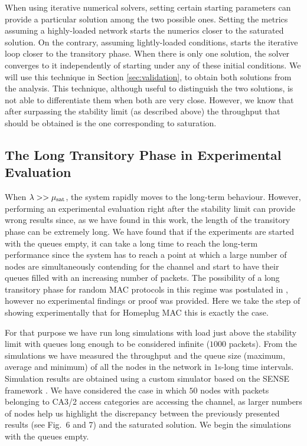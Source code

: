 \documentclass[preprint,12pt]{elsarticle}
\begin{document}
When using iterative numerical solvers, setting certain starting parameters can provide a particular solution among the two possible ones. Setting the metrics assuming a highly-loaded network starts the numerics closer to the saturated solution. On the contrary, assuming lightly-loaded conditions, starts the iterative loop closer to the transitory phase. When there is only one solution, the solver converges to it independently of starting under any of these initial conditions. We will use this technique in Section \ref{sec:validation}, to obtain both solutions from the analysis. This technique, although useful to distinguish the two solutions, is not able to differentiate them when both are very close. However, we know that after surpassing the stability limit (as described above) the throughput that should be obtained is the one corresponding to saturation. 

\subsection{The Long Transitory Phase in Experimental Evaluation}

When $\lambda >> \mu_{\rm sat}$, the system rapidly moves to the long-term behaviour. However, performing an experimental evaluation right after the stability limit can provide wrong results since, as we have found in this work, the length of the transitory phase can be extremely long. We have found that if the experiments are started with the queues empty, it can take a long time to reach the long-term performance since the system has to reach a point at which a large number of nodes are simultaneously contending for the channel and start to have their queues filled with an increasing number of packets. The possibility of a long transitory phase for random MAC protocols in this regime was postulated in \cite{suleiman2008impact}, however no experimental findings or proof was provided. Here we take the step of showing experimentally that for Homeplug MAC this is exactly the case. 

For that purpose we have run long simulations with load just above the stability limit with queues long enough to be considered infinite ($1000$ packets). From the simulations we have measured the throughput and the queue size (maximum, average and minimum) of all the nodes in the network in $1$s-long time intervals. Simulation results are obtained using a custom simulator based on the SENSE framework \cite{chen2004sense}. We have considered the case in which $50$ nodes with packets belonging to CA3/2 access categories are accessing the channel, as larger numbers of nodes help us highlight the discrepancy between the previously presented results (see \cite{chung2006performance} Fig.~6 and 7) and the saturated solution. We begin the simulations with the queues empty.
\end{document}
